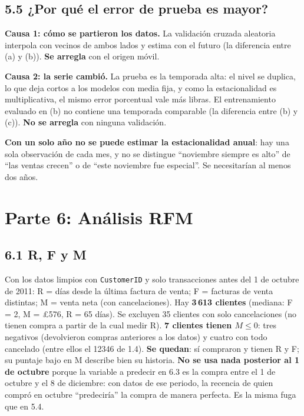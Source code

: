 \documentclass[11pt,letterpaper]{article}
\newcommand{\lib}{\pounds}
\begin{document}
\subsection*{5.5 ¿Por qué el error de prueba es mayor?}

\textbf{Causa 1: cómo se partieron los datos.} La validación cruzada aleatoria interpola con vecinos de ambos lados y estima con el futuro (la diferencia entre (a) y (b)). \textbf{Se arregla} con el origen móvil.

\textbf{Causa 2: la serie cambió.} La prueba es la temporada alta: el nivel se duplica, lo que deja cortos a los modelos con media fija, y como la estacionalidad es multiplicativa, el mismo error porcentual vale más libras. El entrenamiento evaluado en (b) no contiene una temporada comparable (la diferencia entre (b) y (c)). \textbf{No se arregla} con ninguna validación.

\textbf{Con un solo año no se puede estimar la estacionalidad anual}: hay una sola observación de cada mes, y no se distingue ``noviembre siempre es alto'' de ``las ventas crecen'' o de ``este noviembre fue especial''. Se necesitarían al menos dos años.

\section*{Parte 6: Análisis RFM}

\subsection*{6.1 R, F y M}

Con los datos limpios con \texttt{CustomerID} y solo transacciones antes del 1 de octubre de 2011: R = días desde la última factura de venta; F = facturas de venta distintas; M = venta neta (con cancelaciones). Hay \textbf{3\,613 clientes} (mediana: F = 2, M = \lib576, R = 65 días). Se excluyen 35 clientes con solo cancelaciones (no tienen compra a partir de la cual medir R). \textbf{7 clientes tienen $M\le0$}: tres negativos (devolvieron compras anteriores a los datos) y cuatro con todo cancelado (entre ellos el 12346 de 1.4). \textbf{Se quedan}: sí compraron y tienen R y F; su puntaje bajo en M describe bien su historia. \textbf{No se usa nada posterior al 1 de octubre} porque la variable a predecir en 6.3 es la compra entre el 1 de octubre y el 8 de diciembre: con datos de ese periodo, la recencia de quien compró en octubre ``predeciría'' la compra de manera perfecta. Es la misma fuga que en 5.4.
\end{document}

